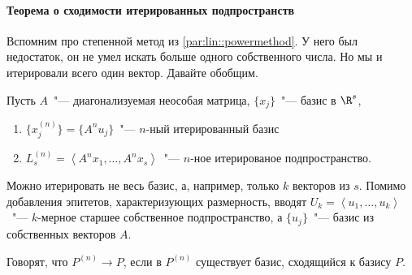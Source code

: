 \documentclass{trlnotes}
\begin{document}
\paragraph{Теорема о сходимости итерированных подпространств}
\label{par:lin::iterspaceconv}

Вспомним про степенной метод из \ref{par:lin::powermethod}.
У него был недостаток, он не умел искать больше одного собственного числа.
Но мы и итерировали всего один вектор. Давайте обобщим.

\begin{defn}\label{defn:lin::iterspaceconv::iterbas}
  Пусть $A$~"--- диагонализуемая неособая матрица, 
  $\{x_{j}\}$~"---  базис в $\R^s$, 
  \begin{enumerate}
    \item $\bigl\{x_{j}^{(n)}\bigr\}=\bigl\{A^nu_j\bigr\}$~"--- 
      $n$-ный итерированный базис
    \item $L_s^{(n)} = \left\langle A^n x_1,\dotsc,A^n x_s\right\rangle$~"--- 
      $n$-ное итерированое подпространство.
  \end{enumerate}
\end{defn}
\begin{rem}
  Можно итерировать не весь базис, а, например, только $k$ векторов из $s$.
  Помимо добавления эпитетов, характеризующих размерность, 
  вводят $U_k=\left\langle u_1, \dotsc, u_k\right\rangle$~"---  $k$-мерное
  старшее собственное подпространство, а $\{u_j\}$~"--- базис из собственных
  векторов $A$.
\end{rem}

\begin{defn}\label{defn:lin::iterspaceconv::iterspconv}
  Говорят, что $P^{(n)} \to P$, если в $P^{(n)}$ существует базис, сходящийся к
  базису $P$.
\end{defn}
\end{document}
